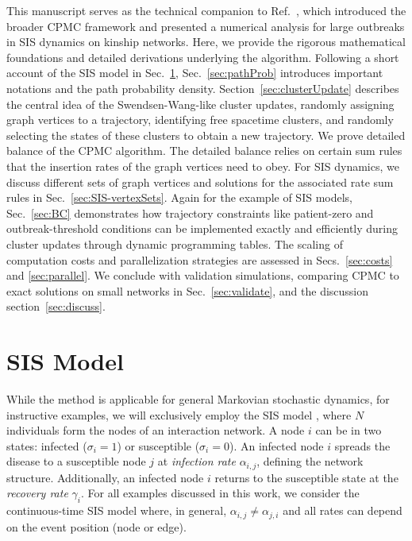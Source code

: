 \documentclass[english,10pt,aps,pra,twocolumn,superscriptaddress,floatfix,fleqn]{revtex4-2}
\begin{document}
This manuscript serves as the technical companion to Ref.~\cite{Sun2026_08}, which introduced the broader CPMC framework and presented a numerical analysis for large outbreaks in SIS dynamics on kinship networks. Here, we provide the rigorous mathematical foundations and detailed derivations underlying the algorithm. Following a short account of the SIS model in Sec.~\ref{sec:sis_model}, Sec.~\ref{sec:pathProb} introduces important notations and the path probability density. Section~\ref{sec:clusterUpdate} describes the central idea of the Swendsen-Wang-like cluster updates, randomly assigning graph vertices to a trajectory, identifying free spacetime clusters, and randomly selecting the states of these clusters to obtain a new trajectory. We prove detailed balance of the CPMC algorithm. The detailed balance relies on certain sum rules that the insertion rates of the graph vertices need to obey. For SIS dynamics, we discuss different sets of graph vertices and solutions for the associated rate sum rules in Sec.~\ref{sec:SIS-vertexSets}. Again for the example of SIS models, Sec.~\ref{sec:BC} demonstrates how trajectory constraints like patient-zero and outbreak-threshold conditions can be implemented exactly and efficiently during cluster updates through dynamic programming tables. The scaling of computation costs and parallelization strategies are assessed in Secs.~\ref{sec:costs} and \ref{sec:parallel}. We conclude with validation simulations, comparing CPMC to exact solutions on small networks in Sec.~\ref{sec:validate}, and the discussion section~\ref{sec:discuss}.

\section{SIS Model}\label{sec:sis_model}
While the method is applicable for general Markovian stochastic dynamics, for instructive examples, we will exclusively employ the SIS model \cite{Hethcote1989,Hethcote2000-42,Brauer2017-2,Rock2014-77,Brauer2019}, where $N$ individuals form the nodes of an interaction network. A node $i$ can be in two states: infected ($\sigma_i=1$) or susceptible ($\sigma_i=0$). An infected node $i$ spreads the disease to a susceptible node $j$ at \emph{infection rate} $\alpha_{i,j}$, defining the network structure. Additionally, an infected node $i$ returns to the susceptible state at the \emph{recovery rate} $\gamma_i$. For all examples discussed in this work, we consider the continuous-time SIS model where, in general, $\alpha_{i,j}\neq\alpha_{j,i}$ and all rates can depend on the event position (node or edge).
\end{document}
